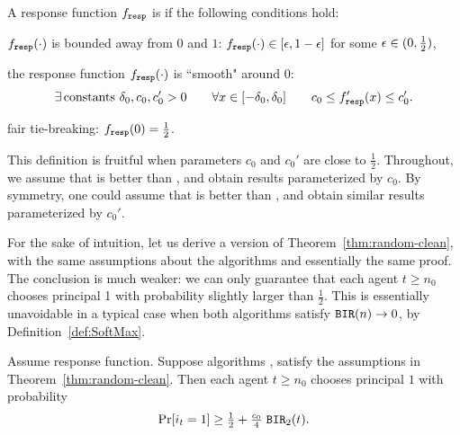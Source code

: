 \begin{definition}\label{def:SoftMax}
A response function $f_{\mathtt{resp}}$ is \SoftMaxRandom if the following conditions hold:
\begin{OneLiners}
\item  $f_{\mathtt{resp}}(\cdot)$ is bounded away from $0$ and $1$:
    $f_{\mathtt{resp}}(\cdot)\in [\epsilon,1-\epsilon]$ for some $\epsilon\in (0,\tfrac12)$,
\item  the response function
 $f_{\mathtt{resp}}(\cdot)$ is ``smooth" around $0$:
 \begin{align}\label{eq:SoftMax-smooth}
 \exists\, \text{constants $\delta_0,c_0,c'_0>0$}
    \qquad \forall x\in [-\delta_0,\delta_0] \qquad
    c_0 \leq f_{\mathtt{resp}}'(x) \leq c'_0.
 \end{align}
\item fair tie-breaking: $f_{\mathtt{resp}}(0)=\tfrac12$.
\end{OneLiners}
\end{definition}

\begin{remark}
This definition is fruitful when parameters $c_0$ and $c_0'$ are close to $\tfrac12$. Throughout, we assume that \alg[1] is better than \alg[2], and obtain results parameterized by $c_0$. By symmetry, one could assume that \alg[2] is better than \alg[1], and obtain similar results parameterized by $c_0'$.
\end{remark}

For the sake of intuition, let us derive a version of Theorem~\ref{thm:random-clean}, with the same assumptions about the algorithms and essentially the same proof. The conclusion is much weaker: we can only guarantee that each agent $t\geq n_0$ chooses principal 1 with probability slightly larger than $\tfrac12$. This is essentially unavoidable in a typical case when both algorithms satisfy $\mathtt{BIR}(n)\to 0$, by Definition~\ref{def:SoftMax}.

\begin{theorem}\label{thm:SoftMax-weak}
Assume \SoftMaxRandom response function.  Suppose algorithms \alg[1], \alg[2] satisfy the assumptions in Theorem~\ref{thm:random-clean}. Then each agent
  $t\geq n_0$ chooses principal $1$ with probability
\begin{align}\label{eq:thm:SoftMax-weak}
     \Pr[i_t = 1]\geq \tfrac12 +  \tfrac{c_0}{4}\; \mathtt{BIR}_2(t).
\end{align}
\end{theorem}


